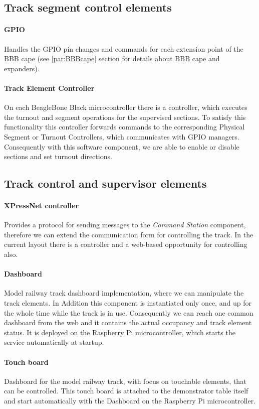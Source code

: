\subsection{Track segment control elements}
\paragraph{GPIO}
Handles the GPIO pin changes and commands for each extension point of the BBB cape (see \ref{par:BBBcape} section for details about BBB cape and expanders).
\paragraph{Track Element Controller}
On each BeagleBone Black microcontroller there is a controller, which executes the turnout and segment operations for the supervised sections. To satisfy this functionality this controller forwards commands to the corresponding Physical Segment or Turnout Controllers, which communicates with GPIO managers. Consequently with this software component, we are able to enable or disable sections and set turnout directions.

\subsection{Track control and supervisor elements}
\paragraph{XPressNet controller}
Provides a protocol for sending messages to the \textit{Command Station} component, therefore we can extend the communication form for controlling the track. In the current layout there is a controller and a web-based opportunity for controlling also.
\paragraph{Dashboard}
Model railway track dashboard implementation, where we can manipulate the track elements. In Addition this component is instantiated only once, and up for the whole time while the track is in use. Consequently we can reach one common dashboard from the web and it contains the actual occupancy and track element status. It is deployed on the Raspberry Pi microcontroller, which starts the service automatically at startup.
\paragraph{Touch board}
Dashboard for the model railway track, with focus on touchable elements, that can be controlled. This touch board is attached to the demonstrator table itself and start automatically with the Dashboard on the Raspberry Pi microcontroller.
